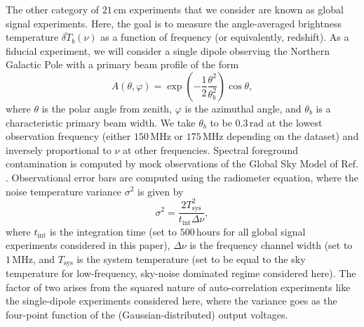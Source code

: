 \documentclass[twocolumn,aps,prd,nofootinbib,showpacs]{revtex4-1}
\begin{document}
The other category of $21\,\textrm{cm}$ experiments that we consider are known as global signal experiments. Here, the goal is to measure the angle-averaged brightness temperature $\overline{\delta T}_b(\nu)$ as a function of frequency (or equivalently, redshift). As a fiducial experiment, we will consider a single dipole observing the Northern Galactic Pole with a primary beam profile of the form
\begin{equation}
A(\theta, \varphi) = \exp \left( -\frac{1}{2} \frac{\theta^2}{\theta_b^2} \right) \cos \theta,
\end{equation}
where $\theta$ is the polar angle from zenith, $\varphi$ is the azimuthal angle, and $\theta_b$ is a characteristic primary beam width. We take $\theta_b$ to be $0.3\,\textrm{rad}$ at the lowest observation frequency (either $150\,\textrm{MHz}$ or $175\,\textrm{MHz}$ depending on the dataset) and inversely proportional to $\nu$ at other frequencies. Spectral foreground contamination is computed by mock observations of the Global Sky Model of Ref. \cite{deOliveiraCosta_et_al2008}. Observational error bars are computed using the radiometer equation, where the noise temperature variance $\sigma^2$ is given by
\begin{equation}
\sigma^2 = \frac{2 T_\textrm{sys}^2}{t_\textrm{int} \Delta \nu},
\end{equation}
where $t_\textrm{int}$ is the integration time (set to $500\,\textrm{hours}$ for all global signal experiments considered in this paper), $\Delta \nu$ is the frequency channel width (set to $1\,\textrm{MHz}$, and $T_\textrm{sys}$ is the system temperature (set to be equal to the sky temperature for low-frequency, sky-noise dominated regime considered here). The factor of two arises from the squared nature of auto-correlation experiments like the single-dipole experiments considered here, where the variance goes as the four-point function of the (Gaussian-distributed) output voltages.
\end{document}
